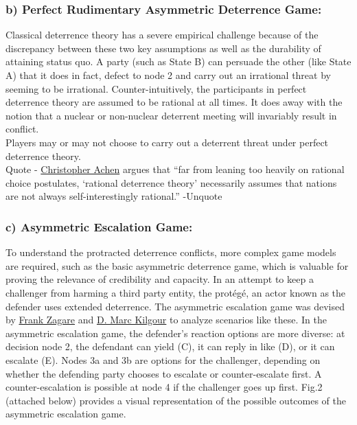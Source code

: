 \documentclass[runningheads]{llncs}
\begin{document}
\subsubsection{b) Perfect Rudimentary Asymmetric Deterrence Game:}
Classical deterrence theory has a severe empirical challenge because of the discrepancy between these two key assumptions as well as the durability of attaining status quo.
A party (such as State B) can persuade the other (like State A) that it does in fact, defect to node 2 and carry out an irrational threat by seeming to be irrational. Counter-intuitively, the participants in perfect deterrence theory are assumed to be rational at all times. It does away with the notion that a nuclear or non-nuclear deterrent meeting will invariably result in conflict.\\
Players may or may not choose to carry out a deterrent threat under perfect deterrence theory.\\
Quote - \href{https://csdp.princeton.edu/people/christopher-h-achen} {Christopher Achen} argues that “far from leaning too heavily on rational choice postulates, ‘rational deterrence theory’ necessarily assumes that nations are not always self-interestingly rational.” -Unquote

\raggedbottom

\subsubsection{c) Asymmetric Escalation Game:} To understand the protracted deterrence conflicts, more complex game models are required, such as the basic asymmetric deterrence game, which is valuable for proving the relevance of credibility and capacity. In an attempt to keep a challenger from harming a third party entity, the protégé, an actor known as the defender uses extended deterrence.
The asymmetric escalation game was devised by \href{https://arts-sciences.buffalo.edu/political-science/faculty/department-faculty/frank-c-zagare.html}{Frank Zagare} and \href{https://www.wlu.ca/academics/faculties/faculty-of-science/faculty-profiles/d-marc-kilgour/index.html}{D. Marc Kilgour} to analyze scenarios like these.
In the asymmetric escalation game, the defender's reaction options are more diverse: at decision node 2, the defendant can yield (C), it can reply in like (D), or it can escalate (E).
Nodes 3a and 3b are options for the challenger, depending on whether the defending party chooses to escalate or counter-escalate first. A counter-escalation is possible at node 4 if the challenger goes up first. Fig.2 (attached below) provides a visual representation of the possible outcomes of the asymmetric escalation game.
\end{document}
